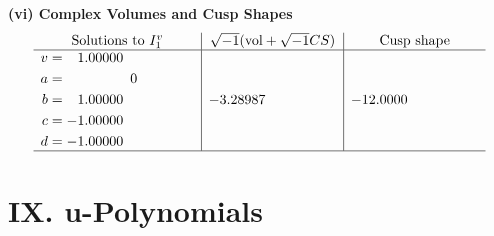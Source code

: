\documentclass[1p]{elsarticle_modified}
\theoremstyle{definition}
\newcommand{\I}{\sqrt{-1}}
\begin{document}
\newpage\flushleft \textbf{(vi) Complex Volumes and Cusp Shapes}
$$\begin{array}{c|c|c}  
\text{Solutions to }I^v_{1}& \I (\text{vol} + \sqrt{-1}CS) & \text{Cusp shape}\\
 \hline 
\begin{aligned}
v &= \phantom{-}1.00000\phantom{ +0.000000I} \\
a &= \phantom{-0.000000 } 0 \\
b &= \phantom{-}1.00000\phantom{ +0.000000I} \\
c &= -1.00000\phantom{ +0.000000I} \\
d &= -1.00000\phantom{ +0.000000I}\end{aligned}
 & -3.28987\phantom{ +0.000000I} & -12.0000\phantom{ +0.000000I}\\
 \hline 
 \end{array}$$\newpage
\newpage\renewcommand{\arraystretch}{1}
\centering \section*{ IX. u-Polynomials}
\end{document}
